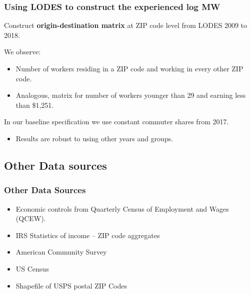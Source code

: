 \documentclass[aspectratio=169, t]{beamer}
\begin{document}
\begin{frame}
    \frametitle{Using LODES to construct the experienced log MW}
    
    \vspace{2mm}
    
    Construct \textbf{origin-destination matrix} at ZIP code level from LODES 2009 to 2018.
    
    \vspace{2mm}

    We observe:
    \begin{itemize} \small
        \item Number of workers residing in a ZIP code and working in every other 
        ZIP code.
        \item Analogous, matrix for number of workers younger than 29 and earning less than 
        \$1,251.
    \end{itemize}
    
    \vspace{2mm}    
    In our baseline specification we use constant commuter shares from 2017.
    \begin{itemize} \small
        \item Results are robust to using other years and groups.
    \end{itemize}
\end{frame}

\subsection{Other Data sources}

\begin{frame}
    \frametitle{Other Data Sources} 
    
    \begin{itemize}
        \item Economic controls from Quarterly Census of Employment and Wages 
        {\small (QCEW)}.
        \vspace{2mm} \item IRS Statistics of income -- ZIP code aggregates
        \vspace{2mm} \item American Community Survey
        \vspace{2mm} \item US Census
        \vspace{2mm} \item Shapefile of USPS postal ZIP Codes
    \end{itemize}
\end{frame}
\end{document}
